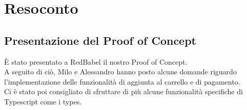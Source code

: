\section{Resoconto}
\subsection{Presentazione del Proof of Concept}

È stato presentato a RedBabel il nostro Proof of Concept. \\A seguito di ciò, Milo e Alessandro hanno posto alcune domande riguardo l'implementazione delle funzionalità di aggiunta al carrello e di pagamento. \\Ci è stato poi consigliato di sfruttare di più alcune funzionalità specifiche di Typescript come i types.
